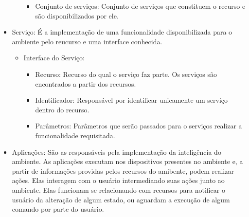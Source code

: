 \begin{itemize}
\begin{itemize}
\begin{itemize}
					\item Conjunto de serviços:
						Conjunto de serviços que constituem o recurso e são disponibilizados por ele.
				\end{itemize}
		\end{itemize}
	\item Serviço:
		É a implementação de uma funcionalidade disponibilizada para o ambiente pelo reucurso e uma interface conhecida.
		\begin{itemize}
			\item Interface do Serviço:
			\begin{itemize}
				\item Recurso:
					Recurso do qual o serviço faz parte. Os serviços são encontrados a partir dos recursos.
				\item Identificador:
					Responsável por identificar unicamente um serviço dentro do recurso.
				\item Parâmetros:
					Parâmetros que serão passados para o serviços realizar a funcionalidade requisitada.
			\end{itemize}
		\end{itemize}
	\item Aplicações:
		São as responsáveis pela implementação da inteligência do ambiente. As aplicações executam nos dispositivos presentes no ambiente e, a partir de informações providas pelos recursos do amibente, podem realizar ações. Elas interagem com o usuário intermediando suas ações junto ao ambiente. Elas funcionam se relacionando com recursos para notificar o usuário da alteração de algum estado, ou aguardam a execução de algum comando por parte do usuário.
\end{itemize}

